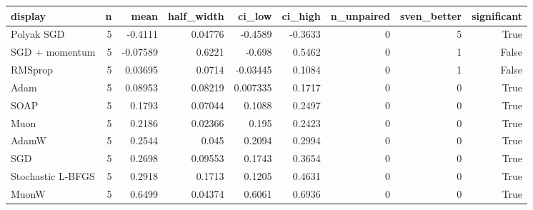 \begin{tabular}{lrrrrrrrr}
\toprule
display & n & mean & half\_width & ci\_low & ci\_high & n\_unpaired & sven\_better & significant \\
\midrule
Polyak SGD & 5 & -0.4111 & 0.04776 & -0.4589 & -0.3633 & 0 & 5 & True \\
SGD + momentum & 5 & -0.07589 & 0.6221 & -0.698 & 0.5462 & 0 & 1 & False \\
RMSprop & 5 & 0.03695 & 0.0714 & -0.03445 & 0.1084 & 0 & 1 & False \\
Adam & 5 & 0.08953 & 0.08219 & 0.007335 & 0.1717 & 0 & 0 & True \\
SOAP & 5 & 0.1793 & 0.07044 & 0.1088 & 0.2497 & 0 & 0 & True \\
Muon & 5 & 0.2186 & 0.02366 & 0.195 & 0.2423 & 0 & 0 & True \\
AdamW & 5 & 0.2544 & 0.045 & 0.2094 & 0.2994 & 0 & 0 & True \\
SGD & 5 & 0.2698 & 0.09553 & 0.1743 & 0.3654 & 0 & 0 & True \\
Stochastic L-BFGS & 5 & 0.2918 & 0.1713 & 0.1205 & 0.4631 & 0 & 0 & True \\
MuonW & 5 & 0.6499 & 0.04374 & 0.6061 & 0.6936 & 0 & 0 & True \\
\bottomrule
\end{tabular}
